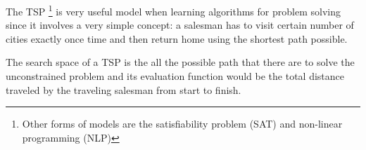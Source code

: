 \documentclass[journal]{IEEEtran}
\begin{document}
The TSP \footnote{Other forms of models are the satisfiability problem (SAT) and non-linear
programming (NLP) } is very useful model when learning algorithms for problem solving 
since it involves a very simple concept: a salesman has to visit certain 
number of cities exactly once time and then return home using the 
shortest path possible. 

The search space of a TSP is the all the possible path that there are 
to solve the unconstrained problem and its evaluation function would be 
the total distance traveled by the traveling salesman from start to finish.









   
\end{document}

